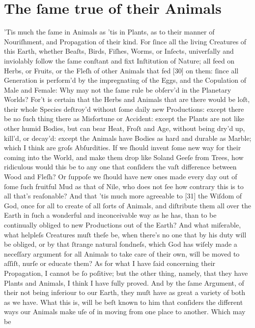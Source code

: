 \documentclass[letterpaper]{book}
\begin{document}
\section{The ſame true of their Animals}

'Tis much the ſame in Animals as 'tis in Plants, as to their manner of
Nouriſhment, and Propagation of their kind. For ſince all the living Creatures
of this Earth, whether Beaſts, Birds, Fiſhes, Worms, or Inſects, univerſally
and inviolably follow the ſame conſtant and fixt Inſtitution of Nature; all
feed on Herbs, or Fruits, or the Fleſh of other Animals that fed [30] on them:
ſince all Generation is perform'd by the impregnating of the Eggs, and the
Copulation of Male and Female: Why may not the ſame rule be obſerv'd in the
Planetary Worlds? For't is certain that the Herbs and Animals that are there
would be loſt, their whole Species deſtroy'd without ſome daily new
Productions: except there be no ſuch thing there as Misfortune or Accident:
except the Plants are not like other humid Bodies, but can bear Heat, Froſt
and Age, without being dry'd up, kill'd, or decay'd: except the Animals have
Bodies as hard and durable as Marble; which I think are groſs Abſurdities. If
we ſhould invent ſome new way for their coming into the World, and make them
drop like Soland Geeſe from Trees, how ridiculous would this be to any one
that conſiders the vaſt difference between Wood and Fleſh? Or ſuppoſe we
ſhould have new ones made every day out of ſome ſuch fruitful Mud as that of
Nile, who does not ſee how contrary this is to all that's reaſonable? And that
'tis much more agreeable to [31] the Wiſdom of God, once for all to create of
all ſorts of Animals, and diſtribute them all over the Earth in ſuch a
wonderful and inconceivable way as he has, than to be continually obliged to
new Productions out of the Earth?  And what miſerable, what helpleſs Creatures
muſt theſe be, when there's no one that by his duty will be obliged, or by
that ſtrange natural fondneſs, which God has wiſely made a neceſſary argument
for all Animals to take care of their own, will be moved to aſſiſt, nurſe or
educate them?  As for what I have ſaid concerning their Propagation, I cannot
be ſo poſitive; but the other thing, namely, that they have Plants and
Animals, I think I have fully proved. And by the ſame Argument, of their not
being inferiour to our Earth, they muſt have as great a variety of both as we
have. What this is, will be beſt known to him that conſiders the different
ways our Animals make uſe of in moving from one place to another. Which may be
\end{document}
